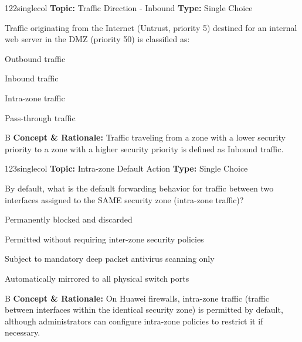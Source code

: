 \begin{qcard}{122}{singlecol}
\textcolor{darkslate!75}{\small\textbf{Topic:} Traffic Direction - Inbound \hfill \textbf{Type:} Single Choice}\vspace{0.4em}\par
Traffic originating from the Internet (Untrust, priority 5) destined for an internal web server in the DMZ (priority 50) is classified as:
\begin{qoptions}
\item Outbound traffic
\item Inbound traffic
\item Intra-zone traffic
\item Pass-through traffic
\end{qoptions}
\end{qcard}
\nopagebreak
\begin{explainbox}{B}
\textbf{Concept \& Rationale:} Traffic traveling from a zone with a lower security priority to a zone with a higher security priority is defined as Inbound traffic.
\end{explainbox}

\begin{qcard}{123}{singlecol}
\textcolor{darkslate!75}{\small\textbf{Topic:} Intra-zone Default Action \hfill \textbf{Type:} Single Choice}\vspace{0.4em}\par
By default, what is the default forwarding behavior for traffic between two interfaces assigned to the SAME security zone (intra-zone traffic)?
\begin{qoptions}
\item Permanently blocked and discarded
\item Permitted without requiring inter-zone security policies
\item Subject to mandatory deep packet antivirus scanning only
\item Automatically mirrored to all physical switch ports
\end{qoptions}
\end{qcard}
\nopagebreak
\begin{explainbox}{B}
\textbf{Concept \& Rationale:} On Huawei firewalls, intra-zone traffic (traffic between interfaces within the identical security zone) is permitted by default, although administrators can configure intra-zone policies to restrict it if necessary.
\end{explainbox}

